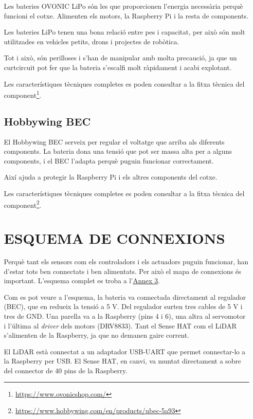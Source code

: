 \documentclass[11pt,a4paper]{article}
\let\origsection\section
\renewcommand{\section}{\clearpage\origsection}
\begin{document}
Les bateries OVONIC LiPo són les que proporcionen l’energia necessària perquè funcioni el cotxe. Alimenten els motors, la Raspberry Pi i la resta de components.

Les bateries LiPo tenen una bona relació entre pes i capacitat, per això són molt utilitzades en vehicles petits, drons i projectes de robòtica.

Tot i això, són perilloses i s’han de manipular amb molta precaució, ja que un curtcircuit pot fer que la bateria s’escalfi molt ràpidament i acabi explotant.

Les característiques tècniques completes es poden consultar a la fitxa tècnica del component\footnote{\url{https://www.ovonicshop.com/}}.

\subsection{Hobbywing BEC}

El Hobbywing BEC serveix per regular el voltatge que arriba als diferents components. La bateria dona una tensió que pot ser massa alta per a alguns components, i el BEC l’adapta perquè puguin funcionar correctament.

Així ajuda a protegir la Raspberry Pi i els altres components del cotxe.

Les característiques tècniques completes es poden consultar a la fitxa tècnica del component\footnote{\url{https://www.hobbywing.com/en/products/ubec-5a93}}.

\section{ESQUEMA DE CONNEXIONS}

Perquè tant els sensors com els controladors i els actuadors puguin funcionar, han d'estar tots ben connectats i ben alimentats. Per això el mapa de connexions és important. L'esquema complet es troba a l'\hyperref[annex-3]{Annex 3}.

Com es pot veure a l'esquema, la bateria va connectada directament al regulador (BEC), que en redueix la tensió a 5 V. Del regulador surten tres cables de 5 V i tres de GND. Una parella va a la Raspberry (pins 4 i 6), una altra al servomotor i l'última al \emph{driver} dels motors (DRV8833). Tant el Sense HAT com el LiDAR s'alimenten de la Raspberry, ja que no demanen gaire corrent.

El LiDAR està connectat a un adaptador USB-UART que permet connectar-lo a la Raspberry per USB. El Sense HAT, en canvi, va muntat directament a sobre del connector de 40 pins de la Raspberry.
\end{document}
